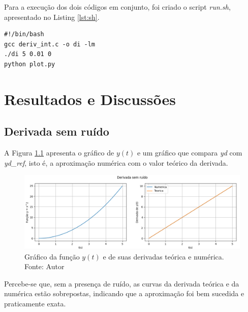 \documentclass[
	12pt,				%
	openany,			%
	twoside,			%
	a4paper,			%
	english,			%
	french,				%
	spanish,			%
	brazil,				%
	]{abntex2}
\begin{document}
Para a execução dos dois códigos em conjunto, foi criado o script \emph{run.sh}, apresentado no Listing \ref{lst:sh}.
\begin{lstlisting}[frame=none,caption={Script para execução dos códigos produzidos.},captionpos=t,label=lst:sh]
#!/bin/bash
gcc deriv_int.c -o di -lm 
./di 5 0.01 0
python plot.py
\end{lstlisting}


\chapter{Resultados e Discussões}

\section{Derivada sem ruído}
A Figura \ref{fig:yd} apresenta o gráfico de $y(t)$ e um gráfico que compara \emph{yd} com \emph{yd\_ref}, isto é, a aproximação numérica com o valor teórico da derivada.
\begin{figure}[H]
\center
    \includegraphics [scale = 0.5]{Figures/yd.png}
    \caption{Gráfico da função $y(t)$ e de suas derivadas teórica e numérica. Fonte: Autor}
    \label{fig:yd}
\end{figure}
Percebe-se que, sem a presença de ruído, as curvas da derivada teórica e da numérica estão sobrepostas, indicando que a aproximação foi bem sucedida e praticamente exata.
\end{document}
